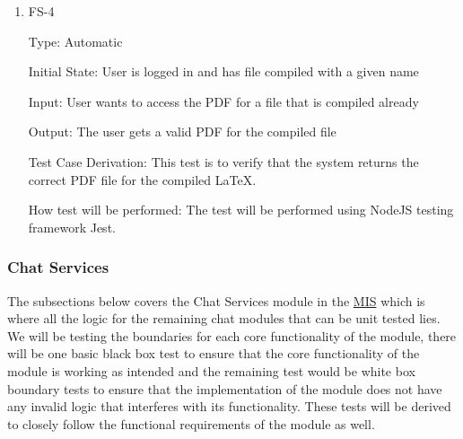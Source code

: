 \documentclass[12pt, titlepage]{article}
\begin{document}
\begin{enumerate}
		\item{FS-4\\}
		
		Type: Automatic
		
		Initial State: User is logged in and has file compiled with a given name
		
		Input: User wants to access the PDF for a file that is compiled already
		
		Output: The user gets a valid PDF for the compiled file
		
		Test Case Derivation: This test is to verify that the system returns the correct PDF file for the compiled LaTeX.
		
		How test will be performed: The test will be performed using NodeJS testing framework Jest.		
		
	\end{enumerate}
	
	\subsubsection{Chat Services}
	
	The subsections below covers the Chat Services module in the \href{https://github.com/RutheniumVI/UnderTree/blob/main/docs/Design/MIS/MIS.pdf}{MIS} which is where all the logic for the remaining chat modules that can be unit tested lies. We will be testing the boundaries for each core functionality of the module, there will be one basic black box test to ensure that the core functionality of the module is working as intended and the remaining test would be white box boundary tests to ensure that the implementation of the module does not have any invalid logic that interferes with its functionality. These tests will be derived to closely follow the functional requirements of the module as well.
	
\end{document}
